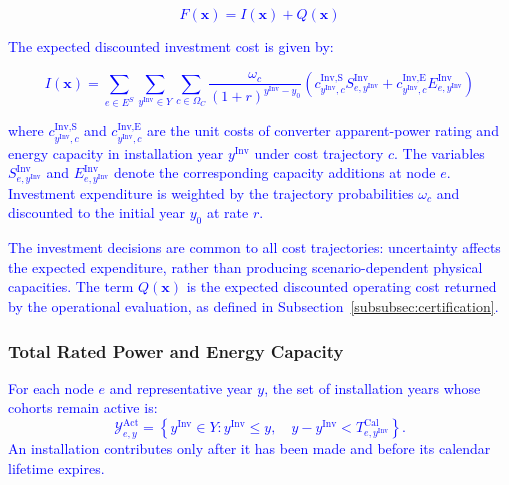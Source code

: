 \documentclass[preprint,12pt]{elsarticle}
\begin{document}
\textcolor{blue}{
    \begin{equation}
        F(\boldsymbol{x}) = I(\boldsymbol{x}) + Q(\boldsymbol{x})
        \label{eq:master_objective_value}
    \end{equation}
}

\textcolor{blue}{
    The expected discounted investment cost is given by:
}

\textcolor{blue}{
    \begin{equation}
        I(\boldsymbol{x}) = \sum_{e\in E^S} \sum_{y^{\text{Inv}}\in Y} \sum_{c\in\Omega_C} \frac{\omega_c}{(1+r)^{y^{\text{Inv}}-y_0}}
        \left(
            c^{\text{Inv,S}}_{y^{\text{Inv}},c} S^{\text{Inv}}_{e,y^{\text{Inv}}}
            +
            c^{\text{Inv,E}}_{y^{\text{Inv}},c} E^{\text{Inv}}_{e,y^{\text{Inv}}}
        \right)
    \end{equation}
}

\noindent
\textcolor{blue}{
    where $c^{\text{Inv,S}}_{y^{\text{Inv}},c}$ and $c^{\text{Inv,E}}_{y^{\text{Inv}},c}$ are the unit costs of converter apparent-power rating and energy capacity in installation year $y^{\text{Inv}}$ under cost trajectory $c$.
    The variables $S^{\text{Inv}}_{e,y^{\text{Inv}}}$ and $E^{\text{Inv}}_{e,y^{\text{Inv}}}$ denote the corresponding capacity additions at node $e$. Investment expenditure is weighted by the trajectory probabilities $\omega_c$ and discounted to the initial year $y_0$ at rate $r$.
}

\textcolor{blue}{
    The investment decisions are common to all cost trajectories: uncertainty affects the expected expenditure, rather than producing scenario-dependent physical capacities.
    The term $Q(\boldsymbol{x})$ is the expected discounted operating cost returned by the operational evaluation, as defined in Subsection~\ref{subsubsec:certification}.
}

\subsubsection{Total Rated Power and Energy Capacity}

\textcolor{blue}{
    For each node $e$ and representative year $y$, the set of
    installation years whose cohorts remain active is:
    \begin{equation}
        \mathcal{Y}^{\text{Act}}_{e,y}
        =
        \left\{
            y^{\text{Inv}}\in Y :
            y^{\text{Inv}}\le y,\quad
            y-y^{\text{Inv}}<
            T^{\text{Cal}}_{e,y^{\text{Inv}}}
        \right\}.
        \label{eq:active_cohorts}
    \end{equation}
    An installation contributes only after it has been made
    and before its calendar lifetime expires.
}
\end{document}
